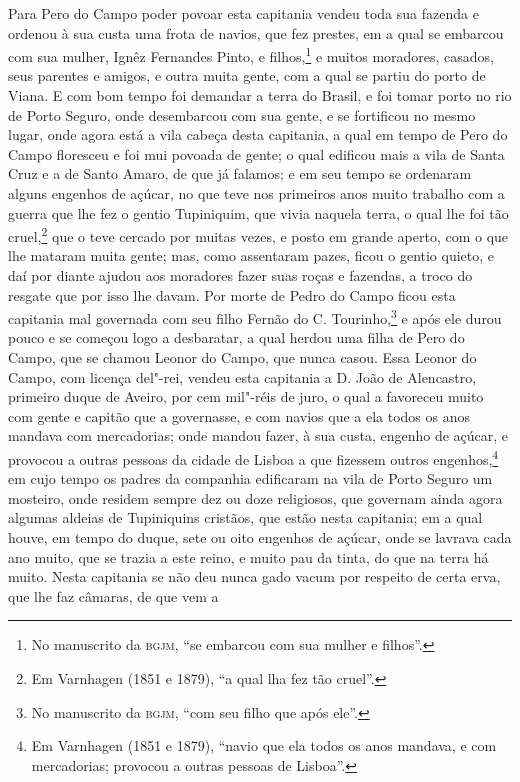 \begin{linenumbers}
Para Pero do Campo poder povoar esta capitania vendeu toda sua fazenda e ordenou à sua
custa uma frota de navios, que fez prestes, em a qual se embarcou com sua mulher, Ignêz
Fernandes Pinto, e filhos,\footnote{ No manuscrito da \textsc{bgjm}, ``se embarcou com sua
mulher e filhos''.} e muitos moradores, casados, seus parentes e amigos, e outra muita
gente, com a qual se partiu do porto de Viana. E com bom tempo foi demandar a terra do
Brasil, e foi tomar porto no rio de Porto Seguro, onde desembarcou com sua gente, e se
fortificou no mesmo lugar, onde agora está a vila cabeça desta capitania, a qual em tempo
de Pero do Campo floresceu e foi mui povoada de gente; o qual edificou mais a vila de
Santa Cruz e a de Santo Amaro, de que já falamos; e em seu tempo se ordenaram alguns
engenhos de açúcar, no que teve nos primeiros anos muito trabalho com a guerra que lhe fez
o gentio Tupiniquim, que vivia naquela terra, o qual lhe foi tão cruel,\footnote{ Em
Varnhagen (1851 e 1879), ``a qual lha fez tão cruel''.} que o teve cercado por muitas
vezes, e posto em grande aperto, com o que lhe mataram muita gente; mas, como assentaram
pazes, ficou o gentio quieto, e daí por diante ajudou aos moradores fazer suas roças e
fazendas, a troco do resgate que por isso lhe davam. Por morte de Pedro do Campo ficou
esta capitania mal governada com seu filho Fernão do C. Tourinho,\footnote{ No manuscrito
da \textsc{bgjm}, ``com seu filho que após ele''.} e após ele durou pouco e se começou
logo a desbaratar, a qual herdou uma filha de Pero do Campo, que se chamou Leonor do
Campo, que nunca casou. Essa Leonor do Campo, com licença del"-rei, vendeu esta capitania a
D. João de Alencastro, primeiro duque de Aveiro, por cem mil"-réis de juro, o qual a
favoreceu muito com gente e capitão que a governasse, e com navios que a ela todos os anos
mandava com mercadorias; onde mandou fazer, à sua custa, engenho de açúcar, e provocou a
outras pessoas da cidade de Lisboa a que fizessem outros engenhos,\footnote{ Em Varnhagen
(1851 e 1879), ``navio que ela todos os anos mandava, e com mercadorias; provocou a outras
pessoas de Lisboa''.} em cujo tempo os padres da companhia edificaram na vila de Porto
Seguro um mosteiro, onde residem sempre dez ou doze religiosos, que governam ainda agora
algumas aldeias de Tupiniquins cristãos, que estão nesta capitania; em a qual houve, em
tempo do duque, sete ou oito engenhos de açúcar, onde se lavrava cada ano muito, que se
trazia a este reino, e muito pau da tinta, do que na terra há muito. Nesta capitania se
não deu nunca gado vacum por respeito de certa erva, que lhe faz câmaras, de que vem a

\end{linenumbers}
